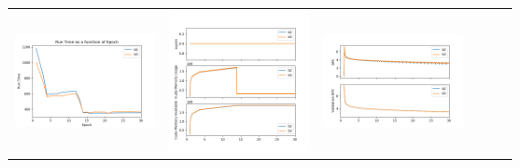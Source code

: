 \begin{longtable}[]{@{}llllll@{}}
\includegraphics{b2_b3_epoch.png} & \includegraphics{b2_b3_memory.png} &
\includegraphics{b2_b3_frac.png} &

\end{longtable}
